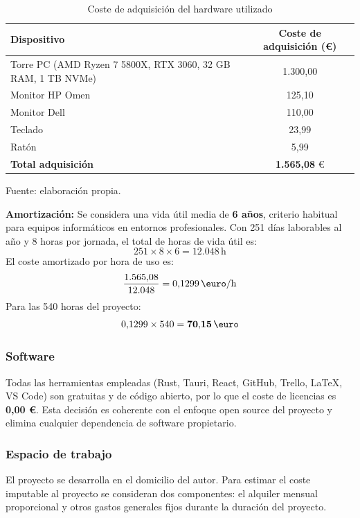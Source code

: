 \documentclass{article}
\begin{document}
    \begin{table}[H]
    \centering
    \begin{tabular}{lc}
    \hline
    \textbf{Dispositivo} & \textbf{Coste de adquisición (\euro)} \\
    \hline
    Torre PC (AMD Ryzen 7 5800X, RTX 3060, 32 GB RAM, 1 TB NVMe) & 1.300,00 \\
    Monitor HP Omen & 125,10 \\
    Monitor Dell & 110,00 \\
    Teclado & 23,99 \\
    Ratón & 5,99 \\
    \hline
    \textbf{Total adquisición} & \textbf{1.565,08} \euro \\
    \hline
    \end{tabular}
    \caption{Coste de adquisición del hardware utilizado}
    \label{tab:hardware_coste}
    \footnotesize Fuente: elaboración propia.
    \end{table}

    \justify
    \textbf{Amortización:} Se considera una vida útil media de \textbf{6 años}, 
    criterio habitual para equipos informáticos en entornos profesionales. Con 
    251 días laborables al año y 8 horas por jornada, el total de horas de vida 
    útil es:
    \[
    251 \times 8 \times 6 = 12.048 \, \text{h}
    \]
    El coste amortizado por hora de uso es:
    \[
    \frac{1.565{,}08}{12.048} = 0{,}1299 \, \text{\euro/h}
    \]
    Para las 540 horas del proyecto:
    \[
    0{,}1299 \times 540 = \mathbf{70{,}15} \, \text{\euro}
    \]

    \subsubsection{Software}
    \normalsize
    \setlength{\parskip}{0.6em}
    \justify
    Todas las herramientas empleadas (Rust, Tauri, React, GitHub, Trello, \LaTeX{}, 
    VS Code) son gratuitas y de código abierto, por lo que el coste de licencias es 
    \textbf{0,00 \euro}. Esta decisión es coherente con el enfoque open source del 
    proyecto y elimina cualquier dependencia de software propietario.

    \subsubsection{Espacio de trabajo}
    \normalsize
    \setlength{\parskip}{0.6em}
    \justify
    El proyecto se desarrolla en el domicilio del autor. Para estimar el coste 
    imputable al proyecto se consideran dos componentes: el alquiler mensual 
    proporcional y otros gastos generales fijos durante la duración del proyecto.
\end{document}
